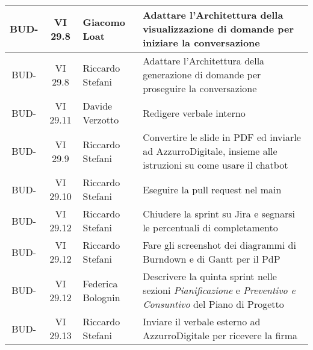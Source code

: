 \begin{table}[htbp]
\begin{tabular}{|c|c|p{}|p{}|}
    BUD- & VI 29.8 & Giacomo Loat & Adattare l'Architettura della visualizzazione di domande per iniziare la conversazione\\
    \hline
    BUD- & VI 29.8 & Riccardo Stefani & Adattare l'Architettura della generazione di domande per proseguire la conversazione\\
    \hline
    BUD- & VI 29.11 & Davide Verzotto & Redigere verbale interno \\
    \hline
    BUD- & VI 29.9 & Riccardo Stefani & Convertire le slide in PDF ed inviarle ad AzzurroDigitale, insieme alle istruzioni su come usare il chatbot \\
    \hline
    BUD- & VI 29.10 & Riccardo Stefani & Eseguire la pull request nel main \\
    \hline
    BUD- & VI 29.12 & Riccardo Stefani & Chiudere la sprint su Jira e segnarsi le percentuali di completamento \\
    \hline
    BUD- & VI 29.12 & Riccardo Stefani & Fare gli screenshot dei diagrammi di Burndown e di Gantt per il PdP \\
    \hline
    BUD- & VI 29.12 & Federica Bolognin & Descrivere la quinta sprint nelle sezioni \emph{Pianificazione} e \emph{Preventivo e Consuntivo} del Piano di Progetto\\
    \hline
    BUD- & VI 29.13 & Riccardo Stefani & Inviare il verbale esterno ad AzzurroDigitale per ricevere la firma\\
    \hline

\end{tabular}
\end{table}